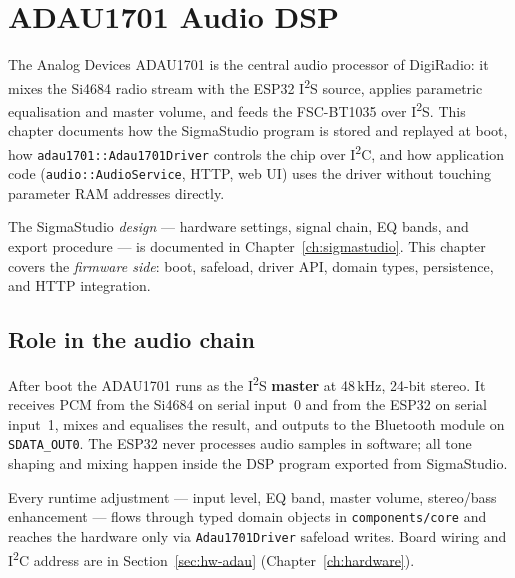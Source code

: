 
\chapter{ADAU1701 Audio DSP}
\label{ch:adau1701}

The Analog Devices ADAU1701 is the central audio processor of DigiRadio: it
mixes the Si4684 radio stream with the ESP32 I\textsuperscript{2}S source,
applies parametric equalisation and master volume, and feeds the
FSC-BT1035 over I\textsuperscript{2}S. This chapter documents how the
SigmaStudio program is stored and replayed at boot, how
\texttt{adau1701::Adau1701Driver} controls the chip over I\textsuperscript{2}C,
and how application code (\texttt{audio::AudioService}, HTTP, web UI) uses the
driver without touching parameter RAM addresses directly.

\begin{drref}
The SigmaStudio \emph{design} --- hardware settings, signal chain, EQ bands,
and export procedure --- is documented in Chapter~\ref{ch:sigmastudio}. This
chapter covers the \emph{firmware side}: boot, safeload, driver API, domain
types, persistence, and HTTP integration.
\end{drref}

\section{Role in the audio chain}
\label{sec:adau1701-role}

After boot the ADAU1701 runs as the I\textsuperscript{2}S \textbf{master}
at 48\,kHz, 24-bit stereo. It receives PCM from the Si4684 on serial input~0
and from the ESP32 on serial input~1, mixes and equalises the result, and
outputs to the Bluetooth module on \texttt{SDATA\_OUT0}. The ESP32 never
processes audio samples in software; all tone shaping and mixing happen inside
the DSP program exported from SigmaStudio.

Every runtime adjustment --- input level, EQ band, master volume, stereo/bass
enhancement --- flows through typed domain objects in \texttt{components/core}
and reaches the hardware only via \texttt{Adau1701Driver} safeload writes.
Board wiring and I\textsuperscript{2}C address are in
Section~\ref{sec:hw-adau} (Chapter~\ref{ch:hardware}).


